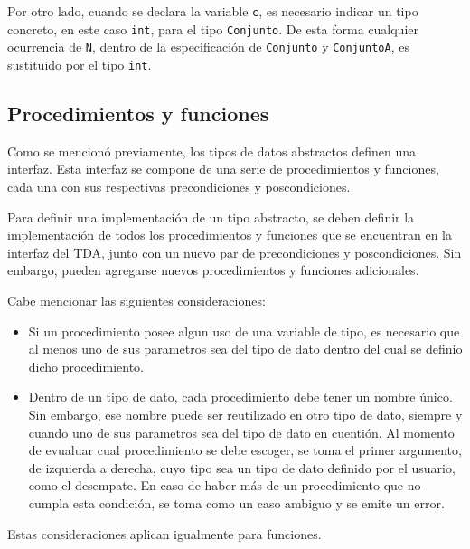 Por otro lado, cuando se declara la variable \texttt{c}, es necesario indicar
un tipo concreto, en este caso \texttt{int}, para el tipo \texttt{Conjunto}. De esta
forma cualquier ocurrencia de \texttt{N}, dentro de la especificación de
\texttt{Conjunto} y \texttt{ConjuntoA}, es sustituido por el tipo \texttt{int}.




\subsection{Procedimientos y funciones}
Como se mencionó previamente, los tipos de datos abstractos definen una
interfaz. Esta interfaz se compone de una serie de procedimientos y funciones,
cada una con sus respectivas precondiciones y poscondiciones.

Para definir una implementación de un tipo abstracto, se deben definir la
implementación de todos los procedimientos y funciones que se encuentran en la
interfaz del TDA, junto con un nuevo par de precondiciones y poscondiciones.
Sin embargo, pueden agregarse nuevos procedimientos y funciones adicionales.

Cabe mencionar las siguientes consideraciones:

\begin{itemize}

  \item Si un procedimiento posee algun uso de una variable de tipo, es
  necesario que al menos uno de sus parametros sea del tipo de dato dentro del
  cual se definio dicho procedimiento.

  \item Dentro de un tipo de dato, cada procedimiento debe tener un nombre único.
  Sin embargo, ese nombre puede ser reutilizado en otro tipo de dato, siempre
  y cuando uno de sus parametros sea del tipo de dato en cuentión. Al momento
  de evualuar cual procedimiento se debe escoger, se toma el primer
  argumento, de izquierda a derecha, cuyo tipo sea un tipo de dato definido por
  el usuario, como el desempate. En caso de haber más de un procedimiento que
  no cumpla esta condición, se toma como un caso ambiguo y se emite un error.

\end{itemize}

Estas consideraciones aplican igualmente para funciones.


